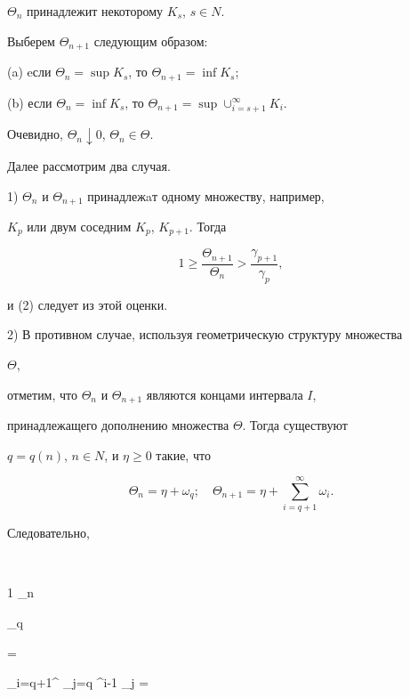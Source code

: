 $\Theta_n$ принадлежит некоторому $K_s$, $s \in N$.


Выберем $\Theta_{n+1}$ следующим образом:





(a) eсли $\Theta_n =\sup K_s$, то $\Theta_{n+1} =\inf K_s$;





(b) если $\Theta_n =\inf K_s$, то $\Theta_{n+1} =\sup


\cup_{i=s+1}^{\infty} K_i$.





Очевидно, $\Theta_n \downarrow 0$, $\Theta_n \in \Theta$.


Далее рассмотрим два случая.





1) $\Theta_n$ и $ \Theta_{n+1}$ принадлежaт одному множеству, например,


$K_p$ или двум соседним $K_p$, $K_{p+1}$. Тогда


$$


1 \ge \frac {\Theta_{n+1}}{\Theta_n} > \frac {\gamma_{p+1}}{\gamma_p},


$$


и (2) следует из этой оценки.





2) В противном случае, используя геометрическую структуру множества


$\Theta$,


отметим, что $\Theta_n$ и $\Theta_{n+1}$ являются концами интервала $I$,


принадлежащего дополнению множества $\Theta$. Тогда существуют


$q=q (n)$, $n \in N$, и $\eta \ge 0$ такие, что


$$


\Theta_n = \eta+\omega_q; \quad \Theta_{n+1} = \eta+


\sum_{i=q+1}^{\infty} \omega_i.


$$


Следовательно,


$$


1 \ge {} {\Theta_n}


\ge {} {


\omega_q} =


\sum_{i=q+1}^{\infty} \prod_{j=q} ^{i-1} \alpha_j =


